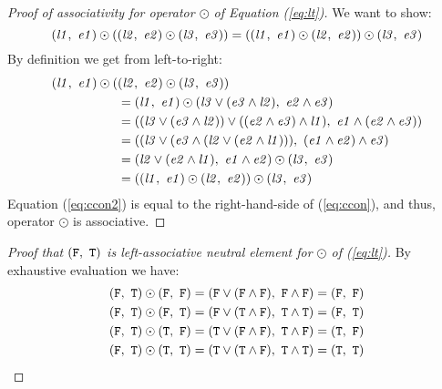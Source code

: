 \begin{proof}[Proof of associativity for operator $\odot$ of Equation (\ref{eq:lt})]\phantom{~}

  We want to show:
  \begin{equation}
    \label{eq:ccon}
    (\mathit{l1},~\mathit{e1}) \odot ((\mathit{l2},~\mathit{e2}) \odot (\mathit{l3},~\mathit{e3})) = ((\mathit{l1},~\mathit{e1}) \odot (\mathit{l2},~\mathit{e2})) \odot (\mathit{l3},~\mathit{e3})
\end{equation}
  By definition we get from left-to-right:
\begin{align}
  (\mathit{l1},~\mathit{e1}) \odot (&(\mathit{l2},~\mathit{e2}) \odot (\mathit{l3},~\mathit{e3}))\\
  &= (\mathit{l1},~\mathit{e1}) \odot (\mathit{l3} \lor (\mathit{e3} \land \mathit{l2}),~\mathit{e2} \land \mathit{e3})\\
  &= ((\mathit{l3} \lor (\mathit{e3} \land \mathit{l2})) \lor ((\mathit{e2} \land \mathit{e3}) \land \mathit{l1}),~\mathit{e1} \land (\mathit{e2} \land \mathit{e3}))\\
  &= ((\mathit{l3} \lor (\mathit{e3} \land (\mathit{l2} \lor (\mathit{e2} \land \mathit{l1}))),~(\mathit{e1} \land \mathit{e2}) \land \mathit{e3})\\
  &= (\mathit{l2} \lor (\mathit{e2} \land \mathit{l1}),~\mathit{e1} \land \mathit{e2}) \odot (\mathit{l3},~\mathit{e3})\\
  &= ((\mathit{l1},~\mathit{e1}) \odot (\mathit{l2},~\mathit{e2})) \odot (\mathit{l3},~\mathit{e3})\label{eq:ccon2}
\end{align}
Equation (\ref{eq:ccon2}) is equal to the right-hand-side of (\ref{eq:ccon}), and thus, operator $\odot$ is associative.
\end{proof}

\bigskip

\begin{proof}[Proof that $(\mathtt{F},~\mathtt{T})$ is left-associative neutral element for $\odot$ of (\ref{eq:lt})]\phantom{~}

By exhaustive evaluation we have:
\begin{align}
  \label{eq:otimesneproof}
  (\mathtt{F},~\mathtt{T}) \odot (\mathtt{F},~\mathtt{F}) &= (\mathtt{F} \lor (\mathtt{F} \land \mathtt{F}),~\mathtt{F} \land \mathtt{F}) = (\mathtt{F},~\mathtt{F}) \\
  (\mathtt{F},~\mathtt{T}) \odot (\mathtt{F},~\mathtt{T}) &= (\mathtt{F} \lor (\mathtt{T} \land \mathtt{F}),~\mathtt{T} \land \mathtt{T}) = (\mathtt{F},~\mathtt{T}) \\
  (\mathtt{F},~\mathtt{T}) \odot (\mathtt{T},~\mathtt{F}) &= (\mathtt{T} \lor (\mathtt{F} \land \mathtt{F}),~\mathtt{T} \land \mathtt{F}) = (\mathtt{T},~\mathtt{F}) \\
  (\mathtt{F},~\mathtt{T}) \odot (\mathtt{T},~\mathtt{T}) &= (\mathtt{T} \lor (\mathtt{T} \land \mathtt{F}),~\mathtt{T} \land \mathtt{T}) = (\mathtt{T},~\mathtt{T})
\end{align}
\end{proof}

